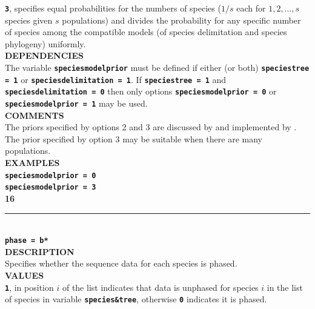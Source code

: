 \documentclass{book}
\numberwithin{equation}{section} \renewcommand{\baselinestretch}{0.55}
\begin{document}
\textbf{\texttt{3}}, specifies equal probabilities for the numbers of species ($1/s$ each for $1,2,\ldots,s$ species given $s$ populations) and divides the probability for any specific number of species among the compatible models (of species delimitation and species phylogeny) uniformly. \vspace{5pt}\\
\textbf{DEPENDENCIES} \vspace{5pt}\\
The variable \textbf{\texttt{speciesmodelprior}} must be defined if either (or both) \textbf{\texttt{speciestree = 1}} or \textbf{\texttt{speciesdelimitation = 1}}. If \textbf{\texttt{speciestree = 1}} and \textbf{\texttt{speciesdelimitation = 0}} then only options \textbf{\texttt{speciesmodelprior = 0}} or \textbf{\texttt{speciesmodelprior = 1}} may be used.\vspace{5pt}\\
\textbf{COMMENTS} \vspace{5pt}\\
The priors specified by options 2 and 3 are discussed by
\cite{Yang2014a} and implemented by \cite{Yang2015}. The prior
specified by option 3 may be
suitable when there are many populations. \vspace{5pt}\\
\textbf{EXAMPLES} \vspace{5pt}\\
\textbf{\texttt{speciesmodelprior = 0}} \vspace{5pt}\\
\textbf{\texttt{speciesmodelprior = 3}}\vspace{10pt}\\
\textbf{{\large 16}} \\
\noindent\rule{\textwidth}{0.8pt} \\
\textbf{{\Large \texttt{phase = b*}}} \vspace{5pt}\\
\textbf{DESCRIPTION} \vspace{5pt}\\
Specifies whether the sequence data for each species is phased.
\vspace{5pt}\\
\textbf{VALUES} \vspace{5pt}\\
\textbf{\texttt{1}}, in position $i$ of the list indicates that data is unphased for species $i$ in the list of species in variable \textbf{\texttt{species\&tree}}, otherwise \textbf{\texttt{0}} indicates it is phased. \vspace{5pt}\\
\end{document}
